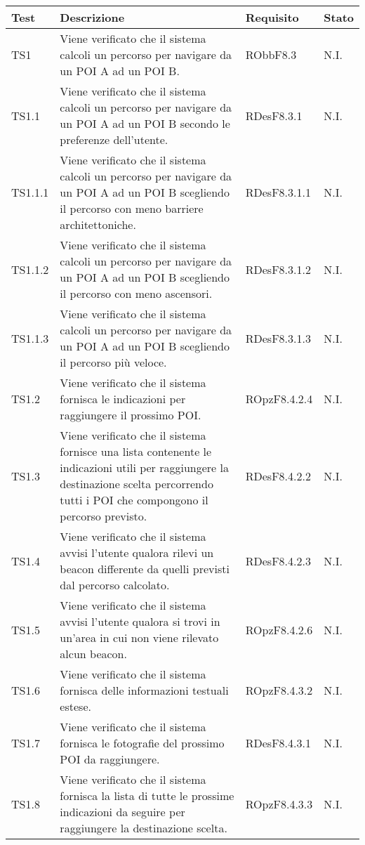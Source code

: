 \documentclass[../PianoDiQualifica.tex]{subfiles}
\begin{document}
\begin{appendices}
	\begin{longtabu} to \textwidth {X[0.7] X[2] X[1.3] X}
\toprule
\textbf{Test} & \textbf{Descrizione} & \textbf{Requisito} & \textbf{Stato}\\
\midrule
\endhead
{}
TS1 & Viene verificato che il sistema calcoli un percorso per navigare da un POI A ad un POI B. & RObbF8.3 & N.I. \\ 
\midrule 
TS1.1 & Viene verificato che il sistema calcoli un percorso per navigare da un POI A ad un POI B secondo le preferenze dell'utente. & RDesF8.3.1 & N.I. \\ 
\midrule 
TS1.1.1 & Viene verificato che il sistema calcoli un percorso per navigare da un POI A ad un POI B scegliendo il percorso con meno barriere architettoniche. & RDesF8.3.1.1 & N.I. \\ 
\midrule 
TS1.1.2 & Viene verificato che il sistema calcoli un percorso per navigare da un POI A ad un POI B scegliendo il percorso con meno ascensori. & RDesF8.3.1.2 & N.I. \\ 
\midrule 
TS1.1.3 & Viene verificato che il sistema calcoli un percorso per navigare da un POI A ad un POI B scegliendo il percorso più veloce. & RDesF8.3.1.3 & N.I. \\ 
\midrule 
TS1.2 & Viene verificato che il sistema fornisca le indicazioni per raggiungere il prossimo POI. & ROpzF8.4.2.4 & N.I. \\ 
\midrule 
TS1.3 & Viene verificato che il sistema fornisce una lista contenente le indicazioni utili per raggiungere la destinazione scelta percorrendo tutti i POI che compongono il percorso previsto. & RDesF8.4.2.2 & N.I. \\ 
\midrule 
TS1.4 & Viene verificato che il sistema avvisi l'utente qualora rilevi un beacon differente da quelli previsti dal percorso calcolato. & RDesF8.4.2.3 & N.I. \\ 
\midrule 
TS1.5 & Viene verificato che il sistema avvisi l'utente qualora si trovi in un'area in cui non viene rilevato alcun beacon. & ROpzF8.4.2.6 & N.I. \\ 
\midrule 
TS1.6 & Viene verificato che il sistema fornisca delle informazioni testuali estese. & ROpzF8.4.3.2 & N.I. \\ 
\midrule 
TS1.7 & Viene verificato che il sistema fornisca le fotografie del prossimo POI da raggiungere. & RDesF8.4.3.1 & N.I. \\ 
\midrule 
TS1.8 & Viene verificato che il sistema fornisca la lista di tutte le prossime indicazioni da seguire per raggiungere la destinazione scelta. & ROpzF8.4.3.3 & N.I. \\ 

\end{longtabu}
\end{appendices}
\end{document}
